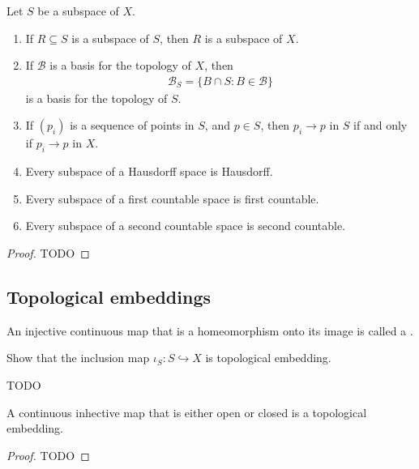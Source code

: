 \begin{proposition}
	Let $ S $ be a subspace of $ X $.
	\begin{enumerate}
		\item If $ R \subseteq S $ is a subspace of $ S $, then $ R $ is a subspace of $ X $.
		\item If $ \mathcal{B} $ is a basis for the topology of $ X $, then
		      \begin{align*}
			      \mathcal{B}_{S} = \{ B \cap S: B \in \mathcal{B} \}
		      \end{align*}
		      is a basis for the topology of $ S $.
		\item If $ ( p_{i} ) $ is a sequence of points in $ S $, and $ p \in S $, then $ p_{i} \to p $ in $ S $ if and only if $ p_{i}\to p $ in $ X $.
		\item Every subspace of a Hausdorff space is Hausdorff.
		\item Every subspace of a first countable space is first countable.
		\item Every subspace of a second countable space is second countable.
	\end{enumerate}
	\begin{proof}
		TODO
	\end{proof}
\end{proposition}

\subsection{Topological embeddings}
\begin{definition}
	An injective continuous map that is a homeomorphism onto its image is called a .
\end{definition}

\begin{exercise}
	\begin{problem}
	Show that the inclusion map $ \iota_{S}:S \hookrightarrow X $ is topological embedding.
	\end{problem}
	\begin{solution}
		TODO
	\end{solution}
\end{exercise}

\begin{proposition}
	A continuous inhective map that is either open or closed is a topological embedding.
	\begin{proof}
		TODO
	\end{proof}
\end{proposition}

